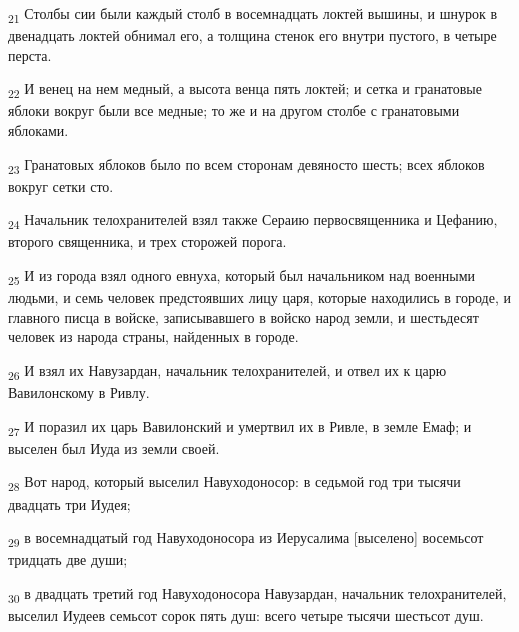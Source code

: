 \begin{tcolorbox}
\textsubscript{21} Столбы сии были каждый столб в восемнадцать локтей вышины, и шнурок в двенадцать локтей обнимал его, а толщина стенок его внутри пустого, в четыре перста.
\end{tcolorbox}
\begin{tcolorbox}
\textsubscript{22} И венец на нем медный, а высота венца пять локтей; и сетка и гранатовые яблоки вокруг были все медные; то же и на другом столбе с гранатовыми яблоками.
\end{tcolorbox}
\begin{tcolorbox}
\textsubscript{23} Гранатовых яблоков было по всем сторонам девяносто шесть; всех яблоков вокруг сетки сто.
\end{tcolorbox}
\begin{tcolorbox}
\textsubscript{24} Начальник телохранителей взял также Сераию первосвященника и Цефанию, второго священника, и трех сторожей порога.
\end{tcolorbox}
\begin{tcolorbox}
\textsubscript{25} И из города взял одного евнуха, который был начальником над военными людьми, и семь человек предстоявших лицу царя, которые находились в городе, и главного писца в войске, записывавшего в войско народ земли, и шестьдесят человек из народа страны, найденных в городе.
\end{tcolorbox}
\begin{tcolorbox}
\textsubscript{26} И взял их Навузардан, начальник телохранителей, и отвел их к царю Вавилонскому в Ривлу.
\end{tcolorbox}
\begin{tcolorbox}
\textsubscript{27} И поразил их царь Вавилонский и умертвил их в Ривле, в земле Емаф; и выселен был Иуда из земли своей.
\end{tcolorbox}
\begin{tcolorbox}
\textsubscript{28} Вот народ, который выселил Навуходоносор: в седьмой год три тысячи двадцать три Иудея;
\end{tcolorbox}
\begin{tcolorbox}
\textsubscript{29} в восемнадцатый год Навуходоносора из Иерусалима [выселено] восемьсот тридцать две души;
\end{tcolorbox}
\begin{tcolorbox}
\textsubscript{30} в двадцать третий год Навуходоносора Навузардан, начальник телохранителей, выселил Иудеев семьсот сорок пять душ: всего четыре тысячи шестьсот душ.
\end{tcolorbox}
